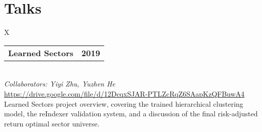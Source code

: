 \documentclass[10pt]{article}
\newcommand{\tabularxwidth}{\textwidth}
\begin{document}

    
        \section{Talks}

    
        \begin{minipage}{\tabularxwidth}
        \begin{tabularx}{\tabularxwidth}{X}
            {
                \begin{tabularx}{\tabularxwidth}{@{}X r}
                    \textbf{Learned Sectors} &
                    \textbf{
        2019} \\
                \end{tabularx}
            } \\

            
                \textit{Collaborators: Yiyi Zhu, Yuzhen He} \\
            

            
                \url{https://drive.google.com/file/d/12DcqxSJAR-PTLZcRqZ6SAapKzQFBuwA4} \\
            
            

            
    Learned Sectors project overview, covering the trained hierarchical clustering model, the reIndexer validation system, and a discussion of the final risk-adjusted return optimal sector universe.
        \end{tabularx}
        
            \vspace{.5em}
        

        \end{minipage}
    
\end{document}
